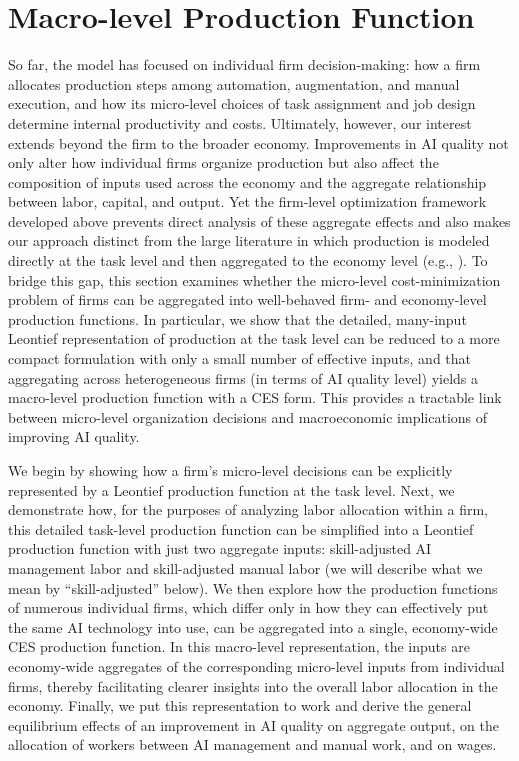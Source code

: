 \section{Macro-level Production Function}
\label{sec:aggregation}

So far, the model has focused on individual firm decision-making: how a firm allocates production steps among automation, augmentation, and manual execution, and how its micro-level choices of task assignment and job design determine internal productivity and costs.
Ultimately, however, our interest extends beyond the firm to the broader economy. 
Improvements in AI quality not only alter how individual firms organize production but also affect the composition of inputs used across the economy and the aggregate relationship between labor, capital, and output.
Yet the firm-level optimization framework developed above prevents direct analysis of these aggregate effects and also makes our approach distinct from the large literature in which production is modeled directly at the task level and then aggregated to the economy level (e.g., \cite{acemoglu2022artificial, acemoglu2024tasks, acemoglu2025simple}).
To bridge this gap, this section examines whether the micro-level cost-minimization problem of firms can be aggregated into well-behaved firm- and economy-level production functions. 
In particular, we show that the detailed, many-input Leontief representation of production at the task level can be reduced to a more compact formulation with only a small number of effective inputs, and that aggregating across heterogeneous firms (in terms of AI quality level) yields a macro-level production function with a CES form.
This provides a tractable link between micro-level organization decisions and macroeconomic implications of improving AI quality.

We begin by showing how a firm's micro-level decisions can be explicitly represented by a Leontief production function at the task level.
Next, we demonstrate how, for the purposes of analyzing labor allocation within a firm, this detailed task-level production function can be simplified into a Leontief production function with just two aggregate inputs: skill-adjusted AI management labor and skill-adjusted manual labor (we will describe what we mean by ``skill-adjusted'' below).
We then explore how the production functions of numerous individual firms, which differ only in how they can effectively put the same AI technology into use, can be aggregated into a single, economy-wide CES production function.
In this macro-level representation, the inputs are economy-wide aggregates of the corresponding micro-level inputs from individual firms, thereby facilitating clearer insights into the overall labor allocation in the economy.
Finally, we put this representation to work and derive the general equilibrium effects of an improvement in AI quality on aggregate output, on the allocation of workers between AI management and manual work, and on wages.

